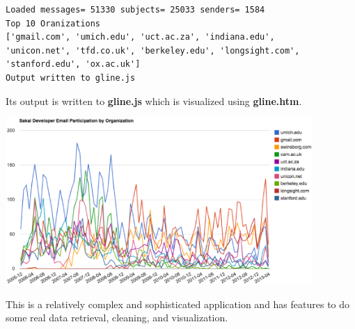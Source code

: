 \beforeverb
\begin{verbatim}
Loaded messages= 51330 subjects= 25033 senders= 1584
Top 10 Oranizations
['gmail.com', 'umich.edu', 'uct.ac.za', 'indiana.edu', 
'unicon.net', 'tfd.co.uk', 'berkeley.edu', 'longsight.com', 
'stanford.edu', 'ox.ac.uk']
Output written to gline.js
\end{verbatim}
\afterverb
%
Its output is written to {\bf gline.js} which is visualized using {\bf gline.htm}.

\beforefig
\centerline{\includegraphics[height=2.50in]{figs2/mailorg.eps}}
\afterfig

This is a relatively complex and sophisticated application and 
has features to do some real data retrieval, cleaning, and visualization.
